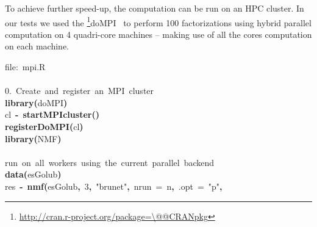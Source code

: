 \documentclass[a4paper]{article}\usepackage{graphicx, color}
\makeatletter
\newcommand{\hlnumber}[1]{\textcolor[rgb]{0,0,0}{#1}}%
\newcommand{\hlfunctioncall}[1]{\textcolor[rgb]{0.501960784313725,0,0.329411764705882}{\textbf{#1}}}%
\newcommand{\hlstring}[1]{\textcolor[rgb]{0.6,0.6,1}{#1}}%
\newcommand{\hlkeyword}[1]{\textcolor[rgb]{0,0,0}{\textbf{#1}}}%
\newcommand{\hlargument}[1]{\textcolor[rgb]{0.690196078431373,0.250980392156863,0.0196078431372549}{#1}}%
\newcommand{\hlcomment}[1]{\textcolor[rgb]{0.180392156862745,0.6,0.341176470588235}{#1}}%
\newcommand{\hlassignement}[1]{\textcolor[rgb]{0,0,0}{\textbf{#1}}}%
\newcommand{\hlsymbol}[1]{\textcolor[rgb]{0,0,0}{#1}}%
\newcommand{\hlstd}[1]{\textcolor[rgb]{0,0,0}{#1}}%
\newenvironment{kframe}{%
 \def\FrameCommand##1{\hskip\@totalleftmargin \hskip-\fboxsep
 \colorbox{shadecolor}{##1}\hskip-\fboxsep
     \hskip-\linewidth \hskip-\@totalleftmargin \hskip\columnwidth}%
 \MakeFramed {\advance\hsize-\width
   \@totalleftmargin\z@ \linewidth\hsize
   \@setminipage}}%
 {\par\unskip\endMakeFramed}
\newenvironment{knitrout}{}{} %
\newcommand{\pkgname}[1]{\textit{#1}\xspace}
\newcommand{\CRANurl}[1]{\url{http://cran.r-project.org/package=#1}}
\def\CRANpkg{\@ifstar\@CRANpkg\@@CRANpkg}
\def\@CRANpkg#1{\href{http://cran.r-project.org/package=#1}{\pkgname{#1}}\footnote{\CRANurl{#1}}}
\def\@@CRANpkg#1{\href{http://cran.r-project.org/package=#1}{\pkgname{#1}} package\footnote{\CRANurl{#1}}}
\newcommand{\citeCRANpkg}[1]{\CRANpkg{#1}~\cite{#1}}
\makeatother
\begin{document}
To achieve further speed-up, the computation can be run on an HPC cluster.
In our tests we used the \citeCRANpkg{doMPI} to perform 100
factorizations using hybrid parallel computation on 4 quadri-core machines -- making use of all
the cores computation on each machine.

\begin{knitrout}
\color{fgcolor}\begin{kframe}
\begin{flushleft}
\ttfamily\noindent
\hlcomment{\usebox{\hlnormalsizeboxhash}{\ }file:{\ }mpi.R}\hspace*{\fill}\\
\hlstd{}\hspace*{\fill}\\
\hlstd{}\hlcomment{\usebox{\hlnormalsizeboxhash}\usebox{\hlnormalsizeboxhash}{\ }0.{\ }Create{\ }and{\ }register{\ }an{\ }MPI{\ }cluster}\hspace*{\fill}\\
\hlstd{}\hlfunctioncall{library}\hlkeyword{(}\hlsymbol{doMPI}\hlkeyword{)}\hspace*{\fill}\\
\hlstd{}\hlsymbol{cl}{\ }\hlassignement{\usebox{\hlnormalsizeboxlessthan}-}{\ }\hlfunctioncall{startMPIcluster}\hlkeyword{(}\hlkeyword{)}\hspace*{\fill}\\
\hlstd{}\hlfunctioncall{registerDoMPI}\hlkeyword{(}\hlsymbol{cl}\hlkeyword{)}\hspace*{\fill}\\
\hlstd{}\hlfunctioncall{library}\hlkeyword{(}\hlsymbol{NMF}\hlkeyword{)}\hspace*{\fill}\\
\hlstd{}\hspace*{\fill}\\
\hlstd{}\hlcomment{\usebox{\hlnormalsizeboxhash}{\ }run{\ }on{\ }all{\ }workers{\ }using{\ }the{\ }current{\ }parallel{\ }backend}\hspace*{\fill}\\
\hlstd{}\hlfunctioncall{data}\hlkeyword{(}\hlsymbol{esGolub}\hlkeyword{)}\hspace*{\fill}\\
\hlstd{}\hlsymbol{res}{\ }\hlassignement{\usebox{\hlnormalsizeboxlessthan}-}{\ }\hlfunctioncall{nmf}\hlkeyword{(}\hlsymbol{esGolub}\hlkeyword{,}{\ }\hlnumber{3}\hlkeyword{,}{\ }\hlstring{"{}brunet"{}}\hlkeyword{,}{\ }\hlargument{nrun}{\ }\hlargument{=}{\ }\hlsymbol{n}\hlkeyword{,}{\ }\hlargument{.opt}{\ }\hlargument{=}{\ }\hlstring{"{}p"{}}\hlkeyword{,}\hspace*{\fill}\\

\end{flushleft}
\end{kframe}
\end{knitrout}
\end{document}
